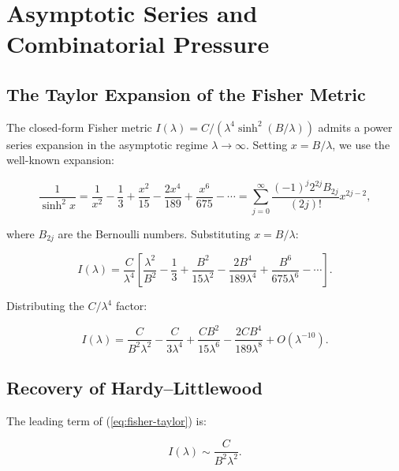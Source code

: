 \documentclass[11pt]{article}
\theoremstyle{remark}
\begin{document}
\section{Asymptotic Series and Combinatorial Pressure}
\label{sec:asymptotic}

\subsection{The Taylor Expansion of the Fisher Metric}

The closed-form Fisher metric $I(\lambda) = C / (\lambda^4 \sinh^2(B/\lambda))$
admits a power series expansion in the asymptotic regime $\lambda \to
\infty$. Setting $x = B/\lambda$, we use the well-known expansion:

\begin{equation}
\frac{1}{\sinh^2 x} = \frac{1}{x^2} - \frac{1}{3} + \frac{x^2}{15}
- \frac{2x^4}{189} + \frac{x^6}{675} - \cdots
= \sum_{j=0}^{\infty} \frac{(-1)^j 2^{2j} B_{2j}}{(2j)!} x^{2j-2},
\label{eq:csch-expansion}
\end{equation}

where $B_{2j}$ are the Bernoulli numbers. Substituting $x = B/\lambda$:

\begin{equation}
I(\lambda) = \frac{C}{\lambda^4} \left[
\frac{\lambda^2}{B^2} - \frac{1}{3} + \frac{B^2}{15\lambda^2}
- \frac{2B^4}{189\lambda^4} + \frac{B^6}{675\lambda^6} - \cdots
\right].
\label{eq:fisher-expansion}
\end{equation}

Distributing the $C/\lambda^4$ factor:

\begin{equation}
I(\lambda) = \frac{C}{B^2 \lambda^2} - \frac{C}{3\lambda^4}
+ \frac{CB^2}{15\lambda^6} - \frac{2CB^4}{189\lambda^8}
+ O(\lambda^{-10}).
\label{eq:fisher-taylor}
\end{equation}

\subsection{Recovery of Hardy--Littlewood}

The leading term of (\ref{eq:fisher-taylor}) is:

\begin{equation}
I(\lambda) \sim \frac{C}{B^2 \lambda^2}.
\end{equation}
\end{document}
